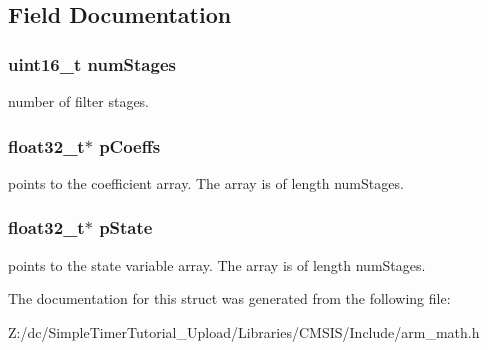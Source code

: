 \subsection{Field Documentation}
\hypertarget{structarm__fir__lattice__instance__f32_a4cceb90547b3e585d4c7aabaa8057212}{
\subsubsection[{num\-Stages}]{\setlength{\rightskip}{0pt plus 5cm}uint16\-\_\-t num\-Stages}}\label{structarm__fir__lattice__instance__f32_a4cceb90547b3e585d4c7aabaa8057212}
number of filter stages. \hypertarget{structarm__fir__lattice__instance__f32_aacbb8dd8eeba4b21fc2bb40076405ee3}{
\subsubsection[{p\-Coeffs}]{\setlength{\rightskip}{0pt plus 5cm}float32\-\_\-t$\ast$ p\-Coeffs}}\label{structarm__fir__lattice__instance__f32_aacbb8dd8eeba4b21fc2bb40076405ee3}
points to the coefficient array. The array is of length num\-Stages. \hypertarget{structarm__fir__lattice__instance__f32_a335c87e6fdc4b96601d95a5de8b9c463}{
\subsubsection[{p\-State}]{\setlength{\rightskip}{0pt plus 5cm}float32\-\_\-t$\ast$ p\-State}}\label{structarm__fir__lattice__instance__f32_a335c87e6fdc4b96601d95a5de8b9c463}
points to the state variable array. The array is of length num\-Stages. 

The documentation for this struct was generated from the following file\-:\begin{DoxyCompactItemize}
\item 
Z\-:/dc/\-Simple\-Timer\-Tutorial\-\_\-\-Upload/\-Libraries/\-C\-M\-S\-I\-S/\-Include/arm\-\_\-math.\-h\end{DoxyCompactItemize}
